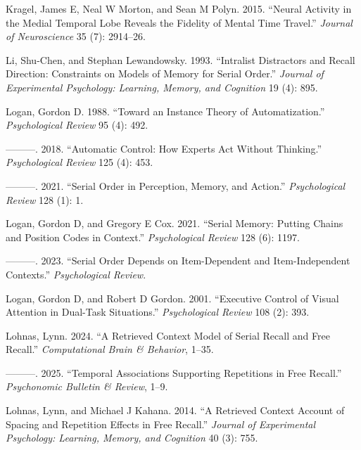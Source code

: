 \documentclass[
  letterpaper,
  11pt,
  english,
  singlespacing,
  headsepline]{MastersDoctoralThesis}
\newlength{\cslhangindent}
\newenvironment{CSLReferences}[2] %
 {\begin{list}{}{%
  \setlength{\itemindent}{0pt}
  \setlength{\leftmargin}{0pt}
  \setlength{\parsep}{0pt}
  \ifodd #1
   \setlength{\leftmargin}{\cslhangindent}
   \setlength{\itemindent}{-1\cslhangindent}
  \fi
  \setlength{\itemsep}{#2\baselineskip}}}
 {\end{list}}
\begin{document}
\begin{CSLReferences}{1}{0}
Kragel, James E, Neal W Morton, and Sean M Polyn. 2015. {``Neural
Activity in the Medial Temporal Lobe Reveals the Fidelity of Mental Time
Travel.''} \emph{Journal of Neuroscience} 35 (7): 2914--26.

Li, Shu-Chen, and Stephan Lewandowsky. 1993. {``Intralist Distractors
and Recall Direction: Constraints on Models of Memory for Serial
Order.''} \emph{Journal of Experimental Psychology: Learning, Memory,
and Cognition} 19 (4): 895.

Logan, Gordon D. 1988. {``Toward an Instance Theory of
Automatization.''} \emph{Psychological Review} 95 (4): 492.

---------. 2018. {``Automatic Control: How Experts Act Without
Thinking.''} \emph{Psychological Review} 125 (4): 453.

---------. 2021. {``Serial Order in Perception, Memory, and Action.''}
\emph{Psychological Review} 128 (1): 1.

Logan, Gordon D, and Gregory E Cox. 2021. {``Serial Memory: Putting
Chains and Position Codes in Context.''} \emph{Psychological Review} 128
(6): 1197.

---------. 2023. {``Serial Order Depends on Item-Dependent and
Item-Independent Contexts.''} \emph{Psychological Review}.

Logan, Gordon D, and Robert D Gordon. 2001. {``Executive Control of
Visual Attention in Dual-Task Situations.''} \emph{Psychological Review}
108 (2): 393.

Lohnas, Lynn. 2024. {``A Retrieved Context Model of Serial Recall and
Free Recall.''} \emph{Computational Brain \& Behavior}, 1--35.

---------. 2025. {``Temporal Associations Supporting Repetitions in Free
Recall.''} \emph{Psychonomic Bulletin \& Review}, 1--9.

Lohnas, Lynn, and Michael J Kahana. 2014. {``A Retrieved Context Account
of Spacing and Repetition Effects in Free Recall.''} \emph{Journal of
Experimental Psychology: Learning, Memory, and Cognition} 40 (3): 755.


\end{CSLReferences}
\end{document}
